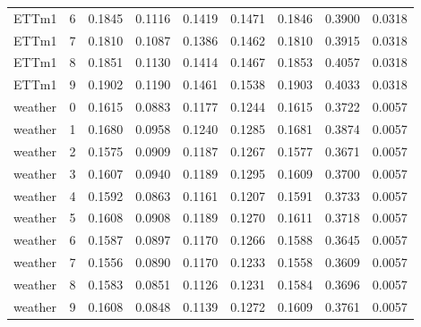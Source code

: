 \begin{longtable}{@{}lrrrrrrrr@{}}
ETTm1 & 6 & 0.1845 & 0.1116 & 0.1419 & 0.1471 & 0.1846 & 0.3900 & 0.0318 \\
ETTm1 & 7 & 0.1810 & 0.1087 & 0.1386 & 0.1462 & 0.1810 & 0.3915 & 0.0318 \\
ETTm1 & 8 & 0.1851 & 0.1130 & 0.1414 & 0.1467 & 0.1853 & 0.4057 & 0.0318 \\
ETTm1 & 9 & 0.1902 & 0.1190 & 0.1461 & 0.1538 & 0.1903 & 0.4033 & 0.0318 \\
weather & 0 & 0.1615 & 0.0883 & 0.1177 & 0.1244 & 0.1615 & 0.3722 & 0.0057 \\
weather & 1 & 0.1680 & 0.0958 & 0.1240 & 0.1285 & 0.1681 & 0.3874 & 0.0057 \\
weather & 2 & 0.1575 & 0.0909 & 0.1187 & 0.1267 & 0.1577 & 0.3671 & 0.0057 \\
weather & 3 & 0.1607 & 0.0940 & 0.1189 & 0.1295 & 0.1609 & 0.3700 & 0.0057 \\
weather & 4 & 0.1592 & 0.0863 & 0.1161 & 0.1207 & 0.1591 & 0.3733 & 0.0057 \\
weather & 5 & 0.1608 & 0.0908 & 0.1189 & 0.1270 & 0.1611 & 0.3718 & 0.0057 \\
weather & 6 & 0.1587 & 0.0897 & 0.1170 & 0.1266 & 0.1588 & 0.3645 & 0.0057 \\
weather & 7 & 0.1556 & 0.0890 & 0.1170 & 0.1233 & 0.1558 & 0.3609 & 0.0057 \\
weather & 8 & 0.1583 & 0.0851 & 0.1126 & 0.1231 & 0.1584 & 0.3696 & 0.0057 \\
weather & 9 & 0.1608 & 0.0848 & 0.1139 & 0.1272 & 0.1609 & 0.3761 & 0.0057 \\
\end{longtable}
